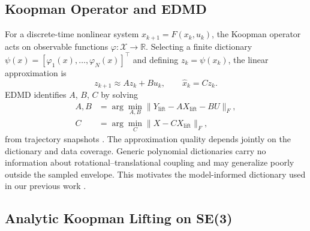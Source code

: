 \documentclass{article}
\begin{document}
\subsection{Koopman Operator and EDMD}

For a discrete-time nonlinear system $x_{k+1}=F(x_{k},u_{k})$, the Koopman operator acts on observable functions $\varphi:\mathcal{X}\to\mathbb{R}$. Selecting a finite dictionary $\psi(x)=[\varphi_{1}(x),\dots,\varphi_{N}(x)]^{\top}$ and defining $z_{k}=\psi(x_{k})$, the linear approximation is
\begin{equation}
z_{k+1} \approx A z_{k} + B u_{k}, \qquad \hat{x}_{k} = C z_{k}.
\label{eq:edmd_basic}
\end{equation}
EDMD identifies $A$, $B$, $C$ by solving
\begin{equation}
\begin{aligned}
A, B &= \arg\min_{A,B}
\| Y_{\mathrm{lift}} - A X_{\mathrm{lift}} - B U \|_F,\\
C &= \arg\min_{C} \| X - C X_{\mathrm{lift}} \|_F,
\end{aligned}
\label{eq:edmd_regression}
\end{equation}
from trajectory snapshots \cite{williams2015, korda2018, proctor2018}. The approximation quality depends jointly on the dictionary and data coverage. Generic polynomial dictionaries carry no information about rotational--translational coupling and may generalize poorly outside the sampled envelope. This motivates the model-informed dictionary used in our previous work \cite{Sekiguchi,xu2024}.

\subsection{Analytic Koopman Lifting on SE(3)}
\end{document}
